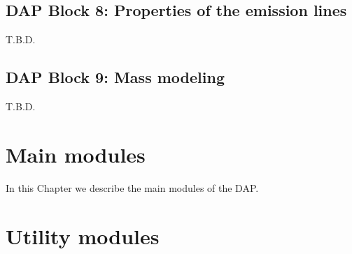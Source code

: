 \documentclass[11pt]{book}
\begin{document}
\section{DAP Block 8: Properties of the emission lines}
\label{dap_sec:block8}
T.B.D.

\section{DAP Block 9: Mass modeling}
\label{dap_sec:block9}
T.B.D.


\chapter{Main modules}
\label{dap_chap:dap_modules}

In this Chapter we describe the main modules of the DAP.



















%

\chapter{Utility modules}











%
%
	
\end{document}
